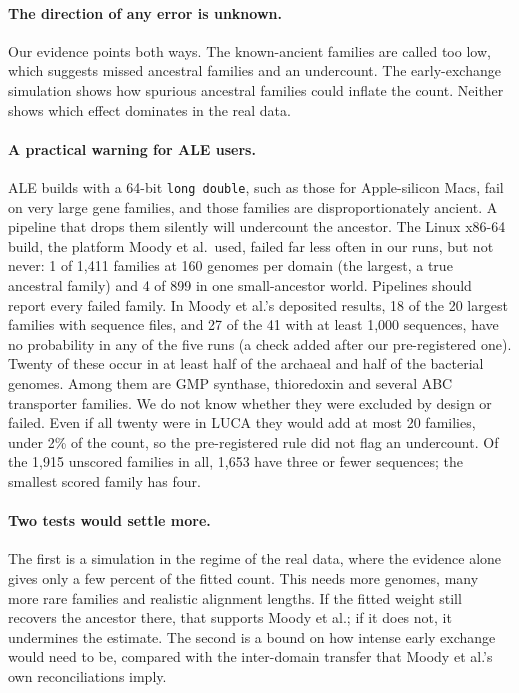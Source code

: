 \documentclass[11pt]{article}
\begin{document}
\paragraph{The direction of any error is unknown.} Our evidence points both ways. The known-ancient families are called too low, which suggests missed ancestral families and an undercount. The early-exchange simulation shows how spurious ancestral families could inflate the count. Neither shows which effect dominates in the real data.

\paragraph{A practical warning for ALE users.} ALE builds with a 64-bit \texttt{long double}, such as those for Apple-silicon Macs, fail on very large gene families, and those families are disproportionately ancient. A pipeline that drops them silently will undercount the ancestor. The Linux x86-64 build, the platform Moody et al.\ used, failed far less often in our runs, but not never: 1 of 1,411 families at 160 genomes per domain (the largest, a true ancestral family) and 4 of 899 in one small-ancestor world. Pipelines should report every failed family. In Moody et al.'s deposited results, 18 of the 20 largest families with sequence files, and 27 of the 41 with at least 1,000 sequences, have no probability in any of the five runs (a check added after our pre-registered one). Twenty of these occur in at least half of the archaeal and half of the bacterial genomes. Among them are GMP synthase, thioredoxin and several ABC transporter families. We do not know whether they were excluded by design or failed. Even if all twenty were in LUCA they would add at most 20 families, under 2\% of the count, so the pre-registered rule did not flag an undercount. Of the 1,915 unscored families in all, 1,653 have three or fewer sequences; the smallest scored family has four.

\paragraph{Two tests would settle more.} The first is a simulation in the regime of the real data, where the evidence alone gives only a few percent of the fitted count. This needs more genomes, many more rare families and realistic alignment lengths. If the fitted weight still recovers the ancestor there, that supports Moody et al.; if it does not, it undermines the estimate. The second is a bound on how intense early exchange would need to be, compared with the inter-domain transfer that Moody et al.'s own reconciliations imply.
\end{document}
